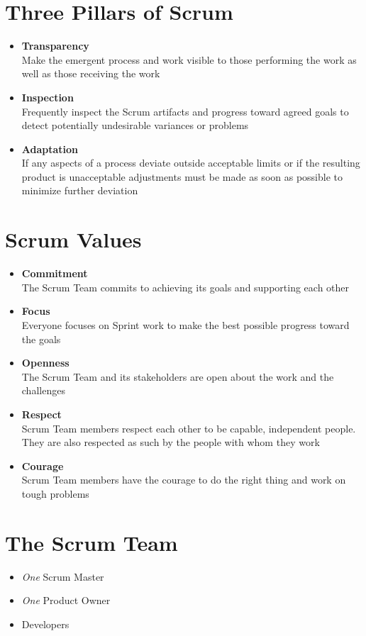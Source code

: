 \documentclass[a4paper,11pt,twocolumn]{article}
\begin{document}
\section*{Three Pillars of Scrum}
\begin{itemize}
	\item \textbf{Transparency}\\
	Make the emergent process and work visible to those performing the work as well as those receiving the work
	\item \textbf{Inspection}\\
	Frequently inspect the Scrum artifacts and progress toward agreed goals to detect potentially undesirable variances or problems
	\item \textbf{Adaptation}\\
	If any aspects of a process deviate outside acceptable limits or if the resulting product is unacceptable adjustments must be made as soon as possible to minimize further deviation
\end{itemize}

\section*{Scrum Values}
\begin{itemize}
    \item \textbf{Commitment}\\
    The Scrum Team commits to achieving its goals and supporting each other
    \item \textbf{Focus}\\
    Everyone focuses on Sprint work to make the best possible progress toward the goals
    \item \textbf{Openness}\\
    The Scrum Team and its stakeholders are open about the work and the challenges
    \item \textbf{Respect}\\
    Scrum Team members respect each other to be capable, independent people. They are also respected as such by the people with whom they work
    \item \textbf{Courage}\\
    Scrum Team members have the courage to do the right thing and work on tough problems
\end{itemize}

\section*{The Scrum Team}
\begin{itemize}
		\item \textit{One} Scrum Master
    \item \textit{One} Product Owner
    \item Developers
\end{itemize}
\end{document}

